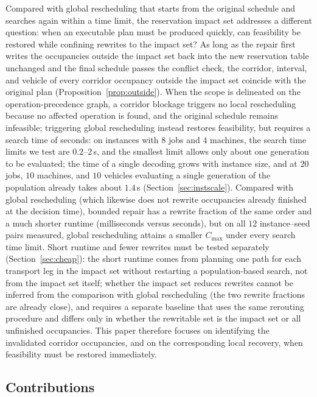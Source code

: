 \documentclass[manuscript,screen,review]{acmart}
\newcommand{\EfiveCells}{12}        %
\begin{document}
Compared with global rescheduling that starts from the original schedule and searches again within a time limit, the reservation impact set addresses a different question:
when an executable plan must be produced quickly, can feasibility be restored while confining rewrites to the impact set?
As long as the repair first writes the occupancies outside the impact set back into the new reservation table unchanged and the final schedule passes the conflict check,
the corridor, interval, and vehicle of every corridor occupancy outside the impact set coincide with the original plan (Proposition~\ref{prop:outside}).
When the scope is delineated on the operation-precedence graph, a corridor blockage triggers no local rescheduling because no affected operation is found, and the original schedule remains infeasible;
triggering global rescheduling instead restores feasibility, but requires a search time of seconds:
on instances with \(8\) jobs and \(4\) machines, the search time limits we test are \(0.2\)--\(2\)\,s, and the smallest limit allows only about one generation to be evaluated;
the time of a single decoding grows with instance size, and at \(20\) jobs, \(10\) machines, and \(10\) vehicles evaluating a single generation of the population already takes about \(1.4\)\,s (Section~\ref{sec:instscale}).
Compared with global rescheduling (which likewise does not rewrite occupancies already finished at the decision time), bounded repair has a rewrite fraction of the same order and a much shorter runtime (milliseconds versus seconds),
but on all \(\EfiveCells\) instance--seed pairs measured, global rescheduling attains a smaller \(C_{\max}\) under every search time limit.
Short runtime and fewer rewrites must be tested separately (Section~\ref{sec:cheap}): the short runtime comes from planning one path for each transport leg in the impact set without restarting a population-based search,
not from the impact set itself; whether the impact set reduces rewrites cannot be inferred from the comparison with global rescheduling (the two rewrite fractions are already close),
and requires a separate baseline that uses the same rerouting procedure and differs only in whether the rewritable set is the impact set or all unfinished occupancies.
This paper therefore focuses on identifying the invalidated corridor occupancies, and on the corresponding local recovery, when feasibility must be restored immediately.

\subsection{Contributions}
\label{sec:contributions}
\end{document}
